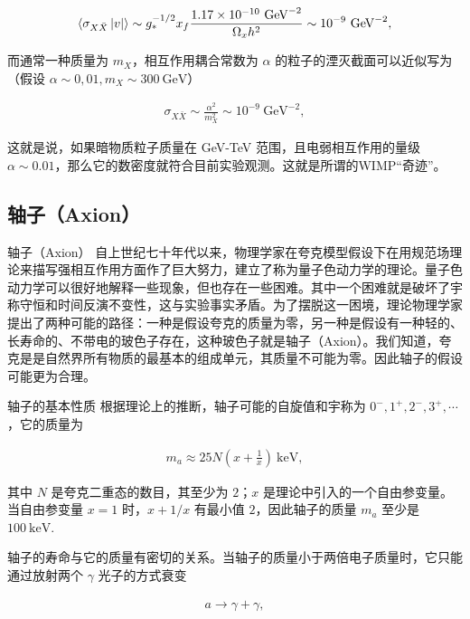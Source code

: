 \documentclass{beamer} %
\begin{document}
\begin{frame}
\begin{align}
\Braket{\sigma_{X\bar{X}}\left|v \right|}
\sim g_*^{-1/2} x_f \frac{1.17 \times 10^{-10} ~\mathrm{GeV}^{-2} }{\Omega_x h^2 } \sim 10^{-9}~\mathrm{GeV}^{-2}, 
\end{align}

而通常一种质量为 $m_X$，相互作用耦合常数为 $\alpha$ 的粒子的湮灭截面可以近似写为（假设 $\alpha\sim 0,01,m_X\sim 300~\mathrm{GeV}$）

\begin{align}
\sigma_{X\bar{X}} \sim \frac{\alpha^2 }{m_X^2 } \sim 10^{-9}~\mathrm{GeV}^{-2},
\end{align}

这就是说，如果暗物质粒子质量在 GeV-TeV 范围，且电弱相互作用的量级 $\alpha\sim 0.01$，那么它的数密度就符合目前实验观测。这就是所谓的WIMP“奇迹”。
\end{frame}

\subsection{轴子（Axion）}

\begin{frame}{轴子（Axion）}
自上世纪七十年代以来，物理学家在夸克模型假设下在用规范场理论来描写强相互作用方面作了巨大努力，建立了称为量子色动力学的理论。量子色动力学可以很好地解释一些现象，但也存在一些困难。其中一个困难就是破坏了宇称守恒和时间反演不变性，这与实验事实矛盾。为了摆脱这一困境，理论物理学家提出了两种可能的路径：一种是假设夸克的质量为零，另一种是假设有一种轻的、长寿命的、不带电的玻色子存在，这种玻色子就是轴子（Axion）。我们知道，夸克是是自然界所有物质的最基本的组成单元，其质量不可能为零。因此轴子的假设可能更为合理。
\end{frame}

\begin{frame}{轴子的基本性质}
根据理论上的推断，轴子可能的自旋值和宇称为 $0^-,1^+,2^-,3^+,\cdots$，它的质量为

\begin{align}
m_a
\approx 25 N \left(x+\frac{1 }{x }  \right)~\mathrm{keV},
\end{align}

其中 $N$ 是夸克二重态的数目，其至少为 $2$；$x$ 是理论中引入的一个自由参变量。当自由参变量 $x=1$ 时，$x+1/x$ 有最小值 $2$，因此轴子的质量 $m_a$ 至少是 $100~\mathrm{keV} .$

轴子的寿命与它的质量有密切的关系。当轴子的质量小于两倍电子质量时，它只能通过放射两个 $\gamma$ 光子的方式衰变

\begin{align}
a \to \gamma + \gamma,
\end{align}
\end{frame}
\end{document}
